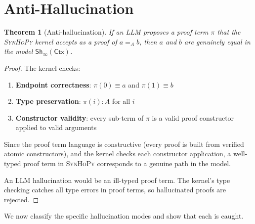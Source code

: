 \documentclass[11pt,a4paper]{report}
\theoremstyle{definition}
\theoremstyle{plain}
\newtheorem{theorem}[definition]{Theorem}
\newcommand{\Ctx}{\mathsf{Ctx}}
\newcommand{\synhopy}{\textsc{SynHoPy}}
\newcommand{\Sh}{\mathsf{Sh}}
\begin{document}
\section{Anti-Hallucination}

\begin{theorem}[Anti-hallucination]
\label{thm:anti-hallucination}
If an LLM proposes a proof term $\pi$ that the \synhopy{} kernel accepts as
a proof of $a =_A b$, then $a$ and $b$ are genuinely equal in the model
$\Sh_\infty(\Ctx)$.
\end{theorem}
\begin{proof}
The kernel checks:
\begin{enumerate}
  \item \textbf{Endpoint correctness}: $\pi(0) \equiv a$ and $\pi(1) \equiv b$
  \item \textbf{Type preservation}: $\pi(i) : A$ for all $i$
  \item \textbf{Constructor validity}: every sub-term of $\pi$ is a valid
    proof constructor applied to valid arguments
\end{enumerate}
Since the proof term language is constructive (every proof is built from
verified atomic constructors), and the kernel checks each constructor
application, a well-typed proof term in \synhopy{} corresponds to a genuine
path in the model.

An LLM hallucination would be an ill-typed proof term. The kernel's type
checking catches all type errors in proof terms, so hallucinated proofs are
rejected.
\end{proof}

We now classify the specific hallucination modes and show that each is caught.
\end{document}
